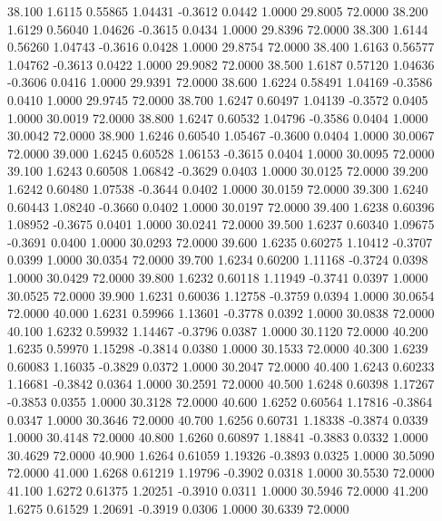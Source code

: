   38.100   1.6115   0.55865   1.04431  -0.3612   0.0442   1.0000  29.8005  72.0000
  38.200   1.6129   0.56040   1.04626  -0.3615   0.0434   1.0000  29.8396  72.0000
  38.300   1.6144   0.56260   1.04743  -0.3616   0.0428   1.0000  29.8754  72.0000
  38.400   1.6163   0.56577   1.04762  -0.3613   0.0422   1.0000  29.9082  72.0000
  38.500   1.6187   0.57120   1.04636  -0.3606   0.0416   1.0000  29.9391  72.0000
  38.600   1.6224   0.58491   1.04169  -0.3586   0.0410   1.0000  29.9745  72.0000
  38.700   1.6247   0.60497   1.04139  -0.3572   0.0405   1.0000  30.0019  72.0000
  38.800   1.6247   0.60532   1.04796  -0.3586   0.0404   1.0000  30.0042  72.0000
  38.900   1.6246   0.60540   1.05467  -0.3600   0.0404   1.0000  30.0067  72.0000
  39.000   1.6245   0.60528   1.06153  -0.3615   0.0404   1.0000  30.0095  72.0000
  39.100   1.6243   0.60508   1.06842  -0.3629   0.0403   1.0000  30.0125  72.0000
  39.200   1.6242   0.60480   1.07538  -0.3644   0.0402   1.0000  30.0159  72.0000
  39.300   1.6240   0.60443   1.08240  -0.3660   0.0402   1.0000  30.0197  72.0000
  39.400   1.6238   0.60396   1.08952  -0.3675   0.0401   1.0000  30.0241  72.0000
  39.500   1.6237   0.60340   1.09675  -0.3691   0.0400   1.0000  30.0293  72.0000
  39.600   1.6235   0.60275   1.10412  -0.3707   0.0399   1.0000  30.0354  72.0000
  39.700   1.6234   0.60200   1.11168  -0.3724   0.0398   1.0000  30.0429  72.0000
  39.800   1.6232   0.60118   1.11949  -0.3741   0.0397   1.0000  30.0525  72.0000
  39.900   1.6231   0.60036   1.12758  -0.3759   0.0394   1.0000  30.0654  72.0000
  40.000   1.6231   0.59966   1.13601  -0.3778   0.0392   1.0000  30.0838  72.0000
  40.100   1.6232   0.59932   1.14467  -0.3796   0.0387   1.0000  30.1120  72.0000
  40.200   1.6235   0.59970   1.15298  -0.3814   0.0380   1.0000  30.1533  72.0000
  40.300   1.6239   0.60083   1.16035  -0.3829   0.0372   1.0000  30.2047  72.0000
  40.400   1.6243   0.60233   1.16681  -0.3842   0.0364   1.0000  30.2591  72.0000
  40.500   1.6248   0.60398   1.17267  -0.3853   0.0355   1.0000  30.3128  72.0000
  40.600   1.6252   0.60564   1.17816  -0.3864   0.0347   1.0000  30.3646  72.0000
  40.700   1.6256   0.60731   1.18338  -0.3874   0.0339   1.0000  30.4148  72.0000
  40.800   1.6260   0.60897   1.18841  -0.3883   0.0332   1.0000  30.4629  72.0000
  40.900   1.6264   0.61059   1.19326  -0.3893   0.0325   1.0000  30.5090  72.0000
  41.000   1.6268   0.61219   1.19796  -0.3902   0.0318   1.0000  30.5530  72.0000
  41.100   1.6272   0.61375   1.20251  -0.3910   0.0311   1.0000  30.5946  72.0000
  41.200   1.6275   0.61529   1.20691  -0.3919   0.0306   1.0000  30.6339  72.0000
